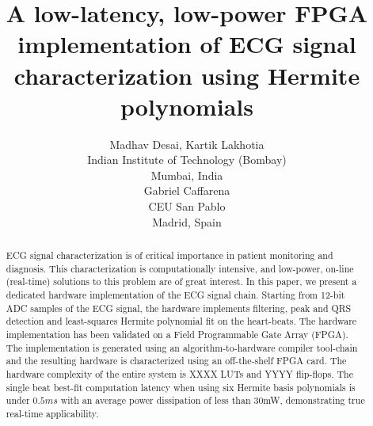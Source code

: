 \documentclass[12pt]{article}
\title{A low-latency, low-power FPGA implementation of ECG signal characterization using Hermite polynomials}
\author{Madhav Desai, Kartik Lakhotia \\
Indian Institute of Technology (Bombay)\\
Mumbai, India \\
Gabriel Caffarena \\
CEU San Pablo\\
Madrid, Spain}
\begin{document}
\maketitle


\begin{abstract}
ECG signal characterization is of critical importance in patient monitoring
and diagnosis.  This characterization is computationally intensive, and
low-power, on-line (real-time) solutions to this problem are of great interest.
In this paper, we present a dedicated hardware implementation of the ECG signal
chain.  Starting from 12-bit ADC samples of the ECG signal, the hardware implements
filtering, peak and QRS detection and least-squares Hermite polynomial fit on the 
heart-beats.  The hardware implementation has been validated on a Field Programmable 
Gate Array (FPGA).  The implementation is generated using an algorithm-to-hardware 
compiler tool-chain and the resulting hardware is characterized using an off-the-shelf 
FPGA card.  
The hardware complexity of the entire system is XXXX LUTs and YYYY flip-flops.
The single beat best-fit computation latency when using six Hermite basis
polynomials is under $0.5ms$ with an average power dissipation of less than
30mW, demonstrating true real-time applicability.  
\end{abstract}


\end{document}
